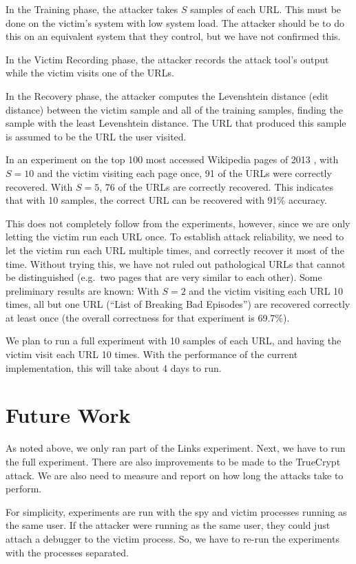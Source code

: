\documentclass{acm_proc_article-sp}
\begin{document}
In the Training phase, the attacker takes $S$ samples of each URL. This must be
done on the victim's system with low system load. The attacker should be to do
this on an equivalent system that they control, but we have not confirmed this.

In the Victim Recording phase, the attacker records the attack tool's output
while the victim visits one of the URLs.

In the Recovery phase, the attacker computes the Levenshtein distance (edit
distance) between the victim sample and all of the training samples, finding the
sample with the least Levenshtein distance. The URL that produced this sample is
assumed to be the URL the user visited.

In an experiment on the top 100 most accessed Wikipedia pages of 2013
\cite{wikitop2013}, with $S=10$ and the victim visiting each page once, 91 of
the URLs were correctly recovered. With $S=5$, 76 of the URLs are correctly
recovered. This indicates that with 10 samples, the correct URL can be recovered
with 91\% accuracy. 

This does not completely follow from the experiments, however, since we are only
letting the victim run each URL once. To establish attack reliability, we need
to let the victim run each URL multiple times, and correctly recover it most of
the time. Without trying this, we have not ruled out pathological URLs that
cannot be distinguished (e.g.\ two pages that are very similar to each other).
Some preliminary results are known: With $S=2$ and the victim visiting each URL
10 times, all but one URL (``List of Breaking Bad Episodes'') are recovered
correctly at least once (the overall correctness for that experiment is 69.7\%).

We plan to run a full experiment with 10 samples of each URL, and having the
victim visit each URL 10 times. With the performance of the current
implementation, this will take about 4 days to run.

\section{Future Work}
\label{sec:future}

As noted above, we only ran part of the Links experiment. Next, we have to run
the full experiment. There are also improvements to be made to the TrueCrypt
attack. We are also need to measure and report on how long the attacks take to
perform.

For simplicity, experiments are run with the spy and victim processes running as
the same user. If the attacker were running as the same user, they could just
attach a debugger to the victim process. So, we have to re-run the experiments
with the processes separated.
\end{document}
